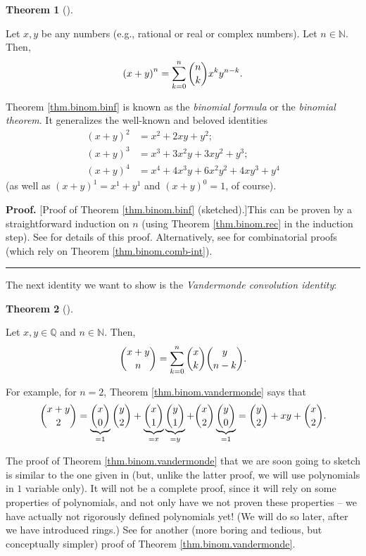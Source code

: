 \documentclass[numbers=enddot,12pt,final,onecolumn,notitlepage]{scrartcl}%
\numberwithin{exer}{subsection}
\theoremstyle{definition}
\newtheorem{theo}{Theorem}[subsection]
\newenvironment{theorem}[1][]
{\begin{theo}[#1]\begin{leftbar}}
{\end{leftbar}\end{theo}}
\newenvironment{proof}[1][Proof]{\noindent\textbf{#1.} }{\ \rule{0.5em}{0.5em}}
\let\sumnonlimits\sum
\renewcommand{\sum}{\sumnonlimits\limits}
\begin{document}
\begin{theorem}
\label{thm.binom.binf}Let $x,y$ be any numbers (e.g., rational or real or
complex numbers). Let $n\in\mathbb{N}$. Then,%
\[
\left(  x+y\right)  ^{n}=\sum_{k=0}^{n}\dbinom{n}{k}x^{k}y^{n-k}.
\]

\end{theorem}

Theorem \ref{thm.binom.binf} is known as the \textit{binomial formula} or the
\textit{binomial theorem}. It generalizes the well-known and beloved
identities%
\begin{align*}
\left(  x+y\right)  ^{2}  &  =x^{2}+2xy+y^{2};\\
\left(  x+y\right)  ^{3}  &  =x^{3}+3x^{2}y+3xy^{2}+y^{3};\\
\left(  x+y\right)  ^{4}  &  =x^{4}+4x^{3}y+6x^{2}y^{2}+4xy^{3}+y^{4}%
\end{align*}
(as well as $\left(  x+y\right)  ^{1}=x^{1}+y^{1}$ and $\left(  x+y\right)
^{0}=1$, of course).

\begin{proof}
[Proof of Theorem \ref{thm.binom.binf} (sketched).]This can be proven by a
straightforward induction on $n$ (using Theorem \ref{thm.binom.rec} in the
induction step). See \cite[Exercise 3.6]{detnotes} for details of this proof.
Alternatively, see \cite[Identity 11.4]{Galvin} for combinatorial proofs
(which rely on Theorem \ref{thm.binom.comb-int}).
\end{proof}

The next identity we want to show is the \textit{Vandermonde convolution
identity}:

\begin{theorem}
\label{thm.binom.vandermonde}Let $x,y\in\mathbb{Q}$ and $n\in\mathbb{N}$.
Then,%
\[
\dbinom{x+y}{n}=\sum_{k=0}^{n}\dbinom{x}{k}\dbinom{y}{n-k}.
\]

\end{theorem}

For example, for $n=2$, Theorem \ref{thm.binom.vandermonde} says that
\[
\dbinom{x+y}{2}=\underbrace{\dbinom{x}{0}}_{=1}\dbinom{y}{2}%
+\underbrace{\dbinom{x}{1}}_{=x}\underbrace{\dbinom{y}{1}}_{=y}+\dbinom{x}%
{2}\underbrace{\dbinom{y}{0}}_{=1}=\dbinom{y}{2}+xy+\dbinom{x}{2}.
\]


The proof of Theorem \ref{thm.binom.vandermonde} that we are soon going to
sketch is similar to the one given in \cite[\S 3.3.3]{detnotes} (but, unlike
the latter proof, we will use polynomials in $1$ variable only). It will not
be a complete proof, since it will rely on some properties of polynomials, and
not only have we not proven these properties -- we have actually not
rigorously defined polynomials yet! (We will do so later, after we have
introduced rings.) See \cite[\S 3.3.2]{detnotes} for another (more boring and
tedious, but conceptually simpler) proof of Theorem
\ref{thm.binom.vandermonde}.
\end{document}
